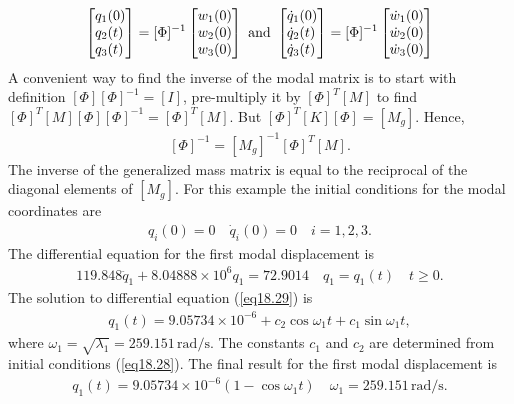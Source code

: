 \documentclass{AeroStructure-ERJohnson}
\begin{document}
\[
\left[\begin{array}{@{}l@{}}q_{1}(0) \\q_{2}(t) \\q_{3}(t)\end{array}\right]=[\Phi]^{-1}\left[\begin{array}{@{}l@{}}w_{1}(0) \\w_{2}(0) \\w_{3}(0)\end{array}\right]\ \text{and}\ \left[\begin{array}{@{}l@{}}\dot{q}_{1}(0) \\\dot{q}_{2}(t) \\\dot{q}_{3}(t)\end{array}\right]=[\Phi]^{-1}\left[\begin{array}{@{}l@{}}\dot{w}_{1}(0) \\\dot{w}_{2}(0) \\\dot{w}_{3}(0)\end{array}\right]
\]
A convenient way to find the inverse of the modal matrix is to start with definition $[\Phi][\Phi]^{-1}=[I]$, pre-multiply it by $[\Phi]^{T}[M]$ to find $[\Phi]^{T}[M][\Phi][\Phi]^{-1}=[\Phi]^{T}[M]$. But $[\Phi]^{T}[K][\Phi]=\left[M_{g}\right]$. Hence,
\begin{align}\label{eq18.27}
[\Phi]^{-1}=\left[M_{g}\right]^{-1}[\Phi]^{T}[M].
\end{align}
The inverse of the generalized mass matrix is equal to the reciprocal of the diagonal elements of $\left[M_{g}\right]$. For this example the initial conditions for the modal coordinates are
\begin{align}\label{eq18.28}
q_{i}(0)=0 \quad \dot{q}_{i}(0)=0 \quad i=1,2,3.
\end{align}
The differential equation for the first modal displacement is
\begin{align}\label{eq18.29}
119.848 \ddot{q}_{1}+8.04888 \times 10^{6} q_{1}=72.9014 \quad q_{1}=q_{1}(t) \quad t \geq 0.
\end{align}
The solution to differential equation (\ref{eq18.29}) is
\begin{align}\label{eq18.30}
q_{1}(t)=9.05734 \times 10^{-6}+c_{2} \cos \omega_{1} t+c_{1} \sin \omega_{1} t,
\end{align}
where $\omega_{1}=\sqrt{\lambda_{1}}=259.151\,\mathrm{rad}/\mathrm{s}$. The constants $c_1$ and $c_2$ are determined from initial conditions (\ref{eq18.28}). The final result for the first modal displacement is
\begin{align}\label{eq18.31}
q_{1}(t)=9.05734 \times 10^{-6}\left(1-\cos \omega_{1} t\right) \quad \omega_{1}=259.151\,\mathrm{rad}/\mathrm{s}.
\end{align}
\end{document}
